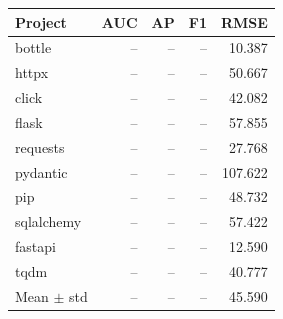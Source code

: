 \begin{tabular}{lrrrr}
\toprule
Project & AUC & AP & F1 & RMSE \\
\midrule
bottle & -- & -- & -- & 10.387 \\
httpx & -- & -- & -- & 50.667 \\
click & -- & -- & -- & 42.082 \\
flask & -- & -- & -- & 57.855 \\
requests & -- & -- & -- & 27.768 \\
pydantic & -- & -- & -- & 107.622 \\
pip & -- & -- & -- & 48.732 \\
sqlalchemy & -- & -- & -- & 57.422 \\
fastapi & -- & -- & -- & 12.590 \\
tqdm & -- & -- & -- & 40.777 \\
\midrule
Mean $\pm$ std & -- & -- & -- & 45.590 \\
\bottomrule
\end{tabular}
